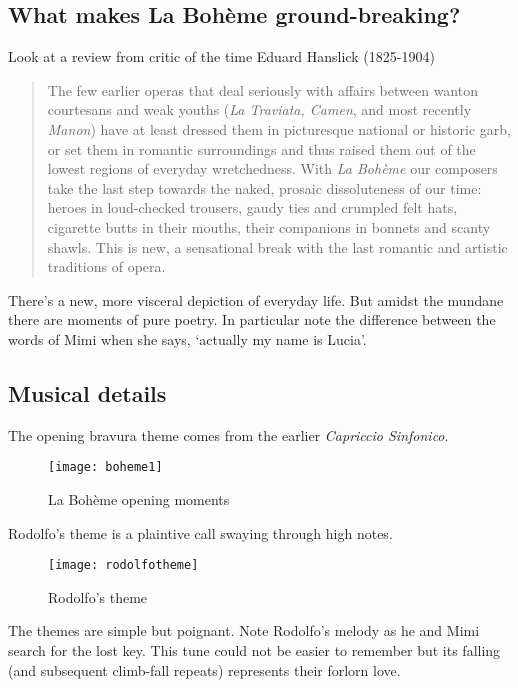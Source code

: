 \subsection{What makes La Boh\`eme ground-breaking?}
Look at a review from critic of the time Eduard Hanslick (1825-1904)
\begin{quotation}
The few earlier operas that deal seriously with affairs between wanton courtesans and weak youths (\textit{La Traviata, Camen}, and most recently \textit{Manon}) have at least dressed them in picturesque national or historic garb, or set them in romantic surroundings and thus raised them out of the lowest regions of everyday wretchedness. With \textit{La Boh\`eme} our composers take the last step towards the naked, prosaic dissoluteness of our time: heroes in loud-checked trousers, gaudy ties and crumpled felt hats, cigarette butts in their mouths, their companions in bonnets and scanty shawls. This is new, a sensational break with the last romantic and artistic traditions of opera.
\end{quotation}

There's a new, more visceral depiction of everyday life. But amidst the mundane there are moments of pure poetry. In particular note the difference between the words of Mimi when she says, `actually my name is Lucia'. 

\subsection{Musical details}

The opening bravura theme comes from the earlier \textit{Capriccio Sinfonico}. 

\begin{figure}[H]
\centering
\texttt{[image: boheme1]}\caption{La Boh\`eme opening moments}
\label{fig:boheme1}
\end{figure}

Rodolfo's theme is a plaintive call swaying through high notes.

\begin{figure}[H]
\centering
\texttt{[image: rodolfotheme]}\caption{Rodolfo's theme}
\label{fig:rodolfotheme}
\end{figure}
 
The themes are simple but poignant. Note Rodolfo's melody as he and Mimi search for the lost key. This tune could not be easier to remember but its falling (and subsequent climb-fall repeats) represents their forlorn love. 

